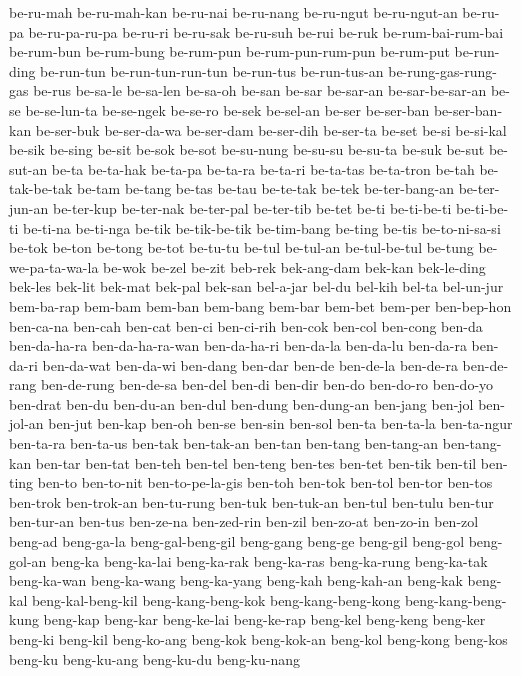 {be-ru-mah be-ru-mah-kan be-ru-nai be-ru-nang be-ru-ngut be-ru-ngut-an
be-ru-pa be-ru-pa-ru-pa be-ru-ri be-ru-sak be-ru-suh be-rui be-ruk
be-rum-bai-rum-bai be-rum-bun be-rum-bung be-rum-pun be-rum-pun-rum-pun
be-rum-put be-run-ding be-run-tun be-run-tun-run-tun be-run-tus
be-run-tus-an be-rung-gas-rung-gas be-rus be-sa-le be-sa-len be-sa-oh
be-san be-sar be-sar-an be-sar-be-sar-an be-se be-se-lun-ta be-se-ngek
be-se-ro be-sek be-sel-an be-ser be-ser-ban be-ser-ban-kan be-ser-buk
be-ser-da-wa be-ser-dam be-ser-dih be-ser-ta be-set be-si be-si-kal be-sik
be-sing be-sit be-sok be-sot be-su-nung be-su-su be-su-ta be-suk be-sut
be-sut-an be-ta be-ta-hak be-ta-pa be-ta-ra be-ta-ri be-ta-tas be-ta-tron
be-tah be-tak-be-tak be-tam be-tang be-tas be-tau be-te-tak be-tek
be-ter-bang-an be-ter-jun-an be-ter-kup be-ter-nak be-ter-pal be-ter-tib
be-tet be-ti be-ti-be-ti be-ti-be-ti be-ti-na be-ti-nga be-tik
be-tik-be-tik be-tim-bang be-ting be-tis be-to-ni-sa-si be-tok be-ton
be-tong be-tot be-tu-tu be-tul be-tul-an be-tul-be-tul be-tung
be-we-pa-ta-wa-la be-wok be-zel be-zit beb-rek bek-ang-dam bek-kan
bek-le-ding bek-les bek-lit bek-mat bek-pal bek-san bel-a-jar bel-du
bel-kih bel-ta bel-un-jur bem-ba-rap bem-bam bem-ban bem-bang bem-bar
bem-bet bem-per ben-bep-hon ben-ca-na ben-cah ben-cat ben-ci ben-ci-rih
ben-cok ben-col ben-cong ben-da ben-da-ha-ra ben-da-ha-ra-wan ben-da-ha-ri
ben-da-la ben-da-lu ben-da-ra ben-da-ri ben-da-wat ben-da-wi ben-dang
ben-dar ben-de ben-de-la ben-de-ra ben-de-rang ben-de-rung ben-de-sa
ben-del ben-di ben-dir ben-do ben-do-ro ben-do-yo ben-drat ben-du
ben-du-an ben-dul ben-dung ben-dung-an ben-jang ben-jol ben-jol-an ben-jut
ben-kap ben-oh ben-se ben-sin ben-sol ben-ta ben-ta-la ben-ta-ngur
ben-ta-ra ben-ta-us ben-tak ben-tak-an ben-tan ben-tang ben-tang-an
ben-tang-kan ben-tar ben-tat ben-teh ben-tel ben-teng ben-tes ben-tet
ben-tik ben-til ben-ting ben-to ben-to-nit ben-to-pe-la-gis ben-toh
ben-tok ben-tol ben-tor ben-tos ben-trok ben-trok-an ben-tu-rung ben-tuk
ben-tuk-an ben-tul ben-tulu ben-tur ben-tur-an ben-tus ben-ze-na
ben-zed-rin ben-zil ben-zo-at ben-zo-in ben-zol beng-ad beng-ga-la
beng-gal-beng-gil beng-gang beng-ge beng-gil beng-gol beng-gol-an beng-ka
beng-ka-lai beng-ka-rak beng-ka-ras beng-ka-rung beng-ka-tak beng-ka-wan
beng-ka-wang beng-ka-yang beng-kah beng-kah-an beng-kak beng-kal
beng-kal-beng-kil beng-kang-beng-kok beng-kang-beng-kong
beng-kang-beng-kung beng-kap beng-kar beng-ke-lai beng-ke-rap beng-kel
beng-keng beng-ker beng-ki beng-kil beng-ko-ang beng-kok beng-kok-an
beng-kol beng-kong beng-kos beng-ku beng-ku-ang beng-ku-du beng-ku-nang
}
